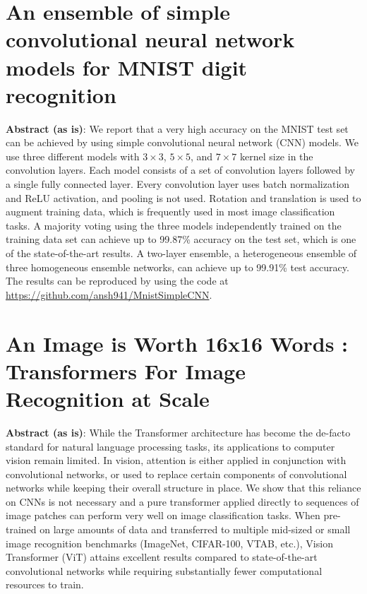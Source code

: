 \documentclass[12pt, a4paper]{report}
\begin{document}
\section{An ensemble of simple convolutional neural network models for MNIST digit recognition}
\label{sec:litppr3}

\textbf{Abstract (as is)}: We report that a very high accuracy on the MNIST test set can be achieved by using simple convolutional neural network (CNN) models. We use three different models with $3\times 3$, $5\times 5$, and $7\times 7$ kernel size in the convolution layers. Each model consists of a set of convolution layers followed by a single fully connected layer. Every convolution layer uses batch normalization and ReLU activation, and pooling is not used. Rotation and translation is used to augment training data, which is frequently used in most image classification tasks. A majority voting using the three models independently trained on the training data set can achieve up to 99.87\% accuracy on the test set, which is one of the state-of-the-art results. A two-layer ensemble, a heterogeneous ensemble of three homogeneous ensemble networks, can achieve up to 99.91\% test accuracy. The results can be reproduced by using the code at \url{https://github.com/ansh941/MnistSimpleCNN}.

\section{An Image is Worth 16x16 Words : Transformers For Image Recognition at Scale}
\label{sec:litppr4}

\textbf{Abstract (as is)}: While the Transformer architecture has become the de-facto standard for natural language processing tasks, its applications to computer vision remain limited. In vision, attention is either applied in conjunction with convolutional networks, or used to replace certain components of convolutional networks while keeping their overall structure in place. We show that this reliance on CNNs is not necessary and a pure transformer applied directly to sequences of image patches can perform very well on image classification tasks. When pre-trained on large amounts of data and transferred to multiple mid-sized or small image recognition benchmarks (ImageNet, CIFAR-100, VTAB, etc.), Vision Transformer (ViT) attains excellent results compared to state-of-the-art convolutional networks while requiring substantially fewer computational resources to train.
\vspace*{\fill}
\end{document}
